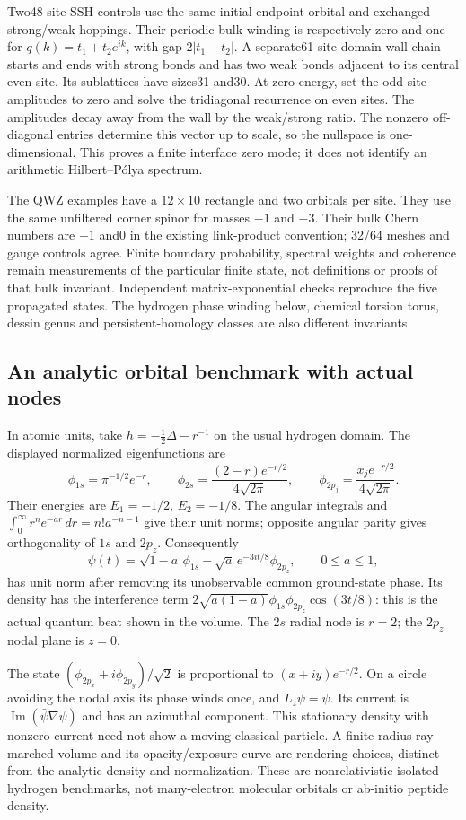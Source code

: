 Two48-site SSH controls use the same initial endpoint orbital and exchanged
strong/weak hoppings. Their periodic bulk winding is respectively zero and
one for $q(k)=t_1+t_2e^{ik}$, with gap $2|t_1-t_2|$. A separate61-site domain-wall chain starts and ends
with strong bonds and has two weak bonds adjacent to its central even site.
Its sublattices have sizes31 and30. At zero energy, set the odd-site amplitudes
to zero and solve the tridiagonal recurrence on even sites. The amplitudes
decay away from the wall by the weak/strong ratio. The nonzero off-diagonal
entries determine this vector up to scale, so the nullspace is one-dimensional.
This proves a finite interface zero mode; it does not identify an arithmetic
Hilbert--P\'olya spectrum.

The QWZ examples have a $12\times10$ rectangle and two orbitals per site.
They use the same unfiltered corner spinor for masses $-1$ and $-3$.
Their bulk Chern numbers are $-1$ and0 in the existing link-product convention;
32/64 meshes and gauge controls agree. Finite boundary probability, spectral
weights and coherence remain measurements of the particular finite state,
not definitions or proofs of that bulk invariant. Independent matrix-exponential
checks reproduce the five propagated states. The hydrogen phase winding below,
chemical torsion torus, dessin genus and persistent-homology classes are also
different invariants.

\subsection{An analytic orbital benchmark with actual nodes}
In atomic units, take $h=-\frac12\Delta-r^{-1}$ on the usual hydrogen domain.
The displayed normalized eigenfunctions are
\[
 \phi_{1s}=\pi^{-1/2}e^{-r},\qquad
 \phi_{2s}=\frac{(2-r)e^{-r/2}}{4\sqrt{2\pi}},\qquad
 \phi_{2p_j}=\frac{x_j e^{-r/2}}{4\sqrt{2\pi}}.
\]
Their energies are $E_1=-1/2$, $E_2=-1/8$. The angular integrals and
$\int_0^\infty r^n e^{-ar}\,dr=n!a^{-n-1}$ give their unit norms;
opposite angular parity gives orthogonality of $1s$ and $2p_z$.
Consequently
\[
 \psi(t)=\sqrt{1-a}\,\phi_{1s}
       +\sqrt a\,e^{-3it/8}\phi_{2p_z},\qquad 0\le a\le1,
\]
has unit norm after removing its unobservable common ground-state phase.
Its density has the interference term
$2\sqrt{a(1-a)}\phi_{1s}\phi_{2p_z}\cos(3t/8)$: this is the actual quantum
beat shown in the volume. The $2s$ radial node is $r=2$; the $2p_z$ nodal
plane is $z=0$.

The state $(\phi_{2p_x}+i\phi_{2p_y})/\sqrt2$ is proportional to
$(x+iy)e^{-r/2}$. On a circle avoiding the nodal axis its phase winds once,
and $L_z\psi=\psi$. Its current is
$\operatorname{Im}(\bar\psi\nabla\psi)$ and has an azimuthal component.
This stationary density with nonzero current need not show a moving classical
particle. A finite-radius ray-marched volume and its opacity/exposure curve
are rendering choices, distinct from the analytic density and normalization.
These are nonrelativistic isolated-hydrogen benchmarks, not many-electron
molecular orbitals or ab-initio peptide density.

